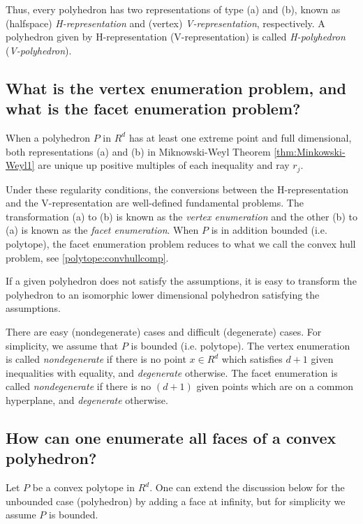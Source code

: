 \documentclass[[a4paper,12pt]{article}
\begin{document}
Thus, every polyhedron has two representations of type (a) and (b),
known as (halfspace) {\em H-representation\/} and (vertex) 
{\em V-representation\/},
respectively.   A polyhedron given by H-representation (V-representation)
is called {\em H-polyhedron} ({\em V-polyhedron}).

\subsection{What is the vertex enumeration problem, and what is the facet enumeration
 problem?} \label{polytope:repconv}

When a polyhedron $P$ in $R^d$ has at least one extreme point and full dimensional,
both representations (a) and (b)  in Miknowski-Weyl 
Theorem \ref{thm:Minkowski-Weyl1}  are  unique up
positive multiples of each inequality and ray $r_j$.  

Under these regularity conditions, the conversions between the H-representation
and the V-representation are well-defined fundamental problems.
The transformation (a) to (b) is known as the {\em vertex enumeration\/}
and the other (b) to (a) is known as the {\em facet enumeration\/}.
When $P$ is in addition bounded (i.e. polytope), the facet enumeration problem
reduces to
what we call the convex hull problem, see \ref{polytope:convhullcomp}.

If a given polyhedron does not satisfy the assumptions, it is easy to
transform the polyhedron to an isomorphic lower dimensional
polyhedron satisfying the assumptions. 

There are easy (nondegenerate) cases and difficult  (degenerate) cases.
For simplicity, we assume that $P$ is  bounded (i.e. polytope).
The vertex enumeration is called {\em nondegenerate\/} if
there is no point $x \in R^d$ which satisfies $d+1$ given inequalities
with equality, and {\em degenerate\/} otherwise.
The facet enumeration
is called {\em nondegenerate\/} if
there is no $(d+1)$ given points  which are on a common
hyperplane, and {\em degenerate\/} otherwise.

\subsection{How can one enumerate all faces of a convex polyhedron?} \label{polytope:faceenum}

Let $P$ be a convex polytope in $R^d$.  One can extend the
discussion below for the unbounded case (polyhedron) by adding
a face at infinity, but for simplicity we assume $P$ is bounded.
\end{document}
